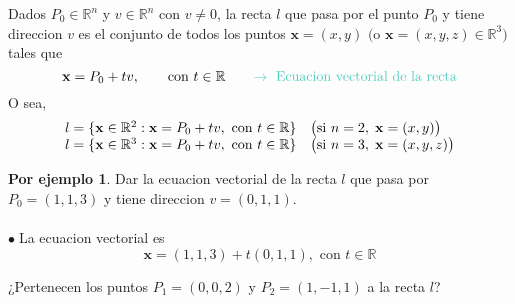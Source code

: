 \documentclass{article}
\theoremstyle{definition}
\theoremstyle{definition}
\newtheorem*{ej}{Por ejemplo}
\theoremstyle{remark}
\newcommand\bl{$\bullet\;$}
\begin{document}
\begin{defi}
  Dados $P_0 \in \mathbb{R}^n$ y $v \in \mathbb{R}^n$ con $v \neq 0$, la recta $l$ que pasa por el punto $P_0$ y tiene direccion $v$ es el conjunto de todos los puntos $\mathbf{x}=(x,y)$  $\big(\text{o } \mathbf{x}=(x,y,z) \in \mathbb{R}^3\big)$ tales que \[
    \mathbf{x} = P_0 + tv, \quad \quad \text{con } t \in \mathbb{R} \quad \quad \textcolor{verdep2}{\rightarrow \text{ Ecuacion vectorial de la recta}}
  \]
  O sea, \[\begin{array}{l}
    l = \{\mathbf{x} \in \mathbb{R}^2 : \mathbf{x} = P_0 + tv, \text{ con } t \in \mathbb{R} \} \quad \big(\text{si $n=2, \; \mathbf{x}=(x,y)$}\big) \\ 
    l = \{ \mathbf{x} \in \mathbb{R}^3 : \mathbf{x} = P_0 + tv, \text{ con } t \in \mathbb{R}\} \quad \big($\text{si $n=3, \; \mathbf{x}=(x,y,z)$}$\big)
    \end{array} \]
\end{defi}
\pagebreak
\begin{ej}
  Dar la ecuacion vectorial de la recta $l$ que pasa por $P_0 =(1,1,3)$ y tiene direccion $v=(0,1,1)$. \\\\ 
  \bl La ecuacion vectorial es \[ 
    \mathbf{x}=(1,1,3)+t(0,1,1), \text{ con } t \in \mathbb{R}
  \]
\end{ej}
\begin{figure}[h]
\centering
\def\svgwidth{0.75\textwidth}

\end{figure}

¿Pertenecen los puntos $P_1 = (0,0,2)$ y $P_2 = (1,-1,1)$ a la recta $l$?  \\
\end{document}
